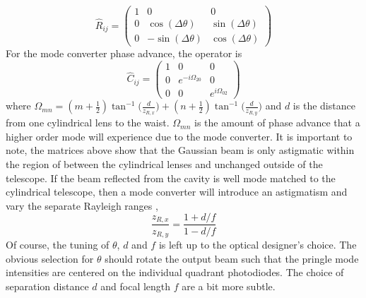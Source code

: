 \begin{equation} \label{rotation}
\hat{R}_{ij} = 
\begin{pmatrix}
1		&0										& 0 
\\ 	0		&\cos(\Delta \theta)						&\sin(\Delta \theta)
\\ 	0		&-\sin(\Delta \theta)						&\cos(\Delta \theta)			

\end{pmatrix}
\end{equation}
For the mode converter phase advance, the operator is
\begin{equation} \label{convert}
\hat{C}_{ij} = 
\begin{pmatrix}
1			&0						& 0 
\\ 	0			&e^{-i \Omega_{20}}		& 0
\\ 	0			&0						&e^{i \Omega_{02}}			

\end{pmatrix}
\end{equation}
where $ \Omega_{mn} = (m+\frac{1}{2}) \tan^{-1}\bigg(\frac{d}{z_{R,x}}\bigg) + (n+\frac{1}{2}) \tan^{-1}\bigg(\frac{d}{z_{R,y}}\bigg) $ and $d$ is the distance from one cylindrical lens to the waist.  $\Omega_{mn}$ is the amount of phase advance that a higher order mode will experience due to the mode converter.  It is important to note, the matrices above show that the Gaussian beam is only astigmatic within the region of between the cylindrical lenses and unchanged outside of the telescope.   If the beam reflected from the cavity is well mode matched to the cylindrical telescope, then a mode converter will introduce an astigmatism and vary the separate Rayleigh ranges \cite{BEIJERSBERGEN},
\begin{equation}
\frac{z_{R,x}}{z_{R,y}} = \frac{1+d/f}{1-d/f}
\end{equation}
Of course, the tuning of $\theta$, $d$ and $f$ is left up to the optical designer's choice.  The obvious selection for $\theta$ should rotate the output beam such that the pringle mode intensities are centered on the individual quadrant photodiodes.  The choice of separation distance $d$ and focal length $f$ are a bit more subtle.  

